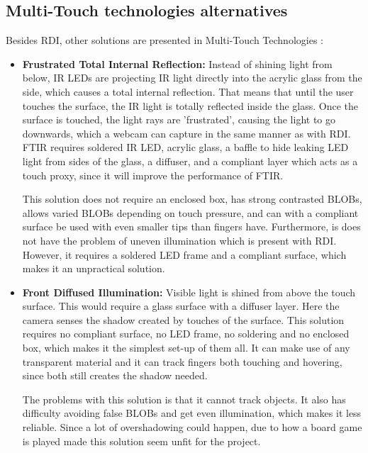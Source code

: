 \subsection{Multi-Touch technologies alternatives}\label{technologiesAlternatives}
Besides RDI, other solutions are presented in Multi-Touch Technologies \citep{multiTT}:

\begin{itemize}
\item \textbf{Frustrated Total Internal Reflection:} Instead of shining light from below, IR LEDs are projecting IR light directly into the acrylic glass from the side, which causes a total internal reflection. That means that until the user touches the surface, the IR light is totally reflected inside the glass. Once the surface is touched, the light rays are 'frustrated', causing the light to go downwards, which a webcam can capture in the same manner as with RDI. FTIR requires soldered IR LED, acrylic glass, a baffle to hide leaking LED light from sides of the glass, a diffuser, and a compliant layer which acts as a touch proxy, since it will improve the performance of FTIR.

This solution does not require an enclosed box, has strong contrasted BLOBs, allows varied BLOBs depending on touch pressure, and can with a compliant surface be used with even smaller tips than fingers have. Furthermore, is does not have the problem of uneven illumination which is present with RDI. However, it requires a soldered LED frame and a compliant surface, which makes it an unpractical solution.

\item \textbf{Front Diffused Illumination:} Visible light is shined from above the touch surface. This would require a glass surface with a diffuser layer. Here the camera senses the shadow created by touches of the surface. This solution requires no compliant surface, no LED frame, no soldering and no enclosed box, which makes it the simplest set-up of them all. It can make use of any transparent material and it can track fingers both touching and hovering, since both still creates the shadow needed.

The problems with this solution is that  it cannot track objects. It also has difficulty avoiding false BLOBs and get even illumination, which makes it less reliable. Since a lot of overshadowing could happen, due to how a board game is played made this solution seem unfit for the project. 


\end{itemize}
